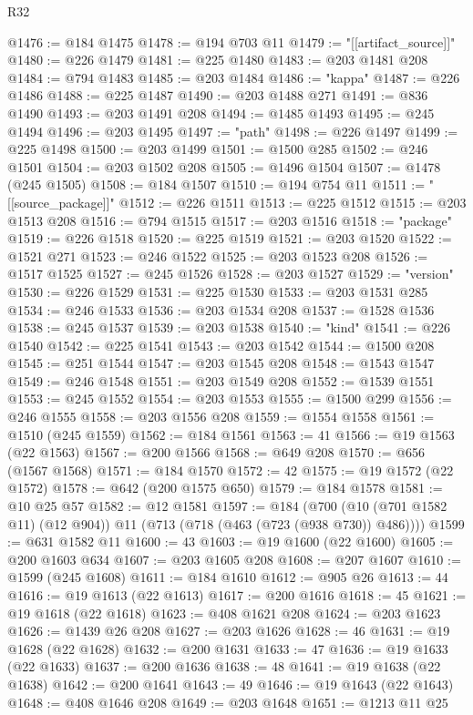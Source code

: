 \begin{lexlean}{R32}
\begin{coremodule}
@1476 := @184 @1475
@1478 := @194 @703 @11
@1479 := "[[artifact_source]]"
@1480 := @226 @1479
@1481 := @225 @1480
@1483 := @203 @1481 @208
@1484 := @794 @1483
@1485 := @203 @1484
@1486 := "kappa"
@1487 := @226 @1486
@1488 := @225 @1487
@1490 := @203 @1488 @271
@1491 := @836 @1490
@1493 := @203 @1491 @208
@1494 := @1485 @1493
@1495 := @245 @1494
@1496 := @203 @1495
@1497 := "path"
@1498 := @226 @1497
@1499 := @225 @1498
@1500 := @203 @1499
@1501 := @1500 @285
@1502 := @246 @1501
@1504 := @203 @1502 @208
@1505 := @1496 @1504
@1507 := @1478 (@245 @1505)
@1508 := @184 @1507
@1510 := @194 @754 @11
@1511 := "[[source_package]]"
@1512 := @226 @1511
@1513 := @225 @1512
@1515 := @203 @1513 @208
@1516 := @794 @1515
@1517 := @203 @1516
@1518 := "package"
@1519 := @226 @1518
@1520 := @225 @1519
@1521 := @203 @1520
@1522 := @1521 @271
@1523 := @246 @1522
@1525 := @203 @1523 @208
@1526 := @1517 @1525
@1527 := @245 @1526
@1528 := @203 @1527
@1529 := "version"
@1530 := @226 @1529
@1531 := @225 @1530
@1533 := @203 @1531 @285
@1534 := @246 @1533
@1536 := @203 @1534 @208
@1537 := @1528 @1536
@1538 := @245 @1537
@1539 := @203 @1538
@1540 := "kind"
@1541 := @226 @1540
@1542 := @225 @1541
@1543 := @203 @1542
@1544 := @1500 @208
@1545 := @251 @1544
@1547 := @203 @1545 @208
@1548 := @1543 @1547
@1549 := @246 @1548
@1551 := @203 @1549 @208
@1552 := @1539 @1551
@1553 := @245 @1552
@1554 := @203 @1553
@1555 := @1500 @299
@1556 := @246 @1555
@1558 := @203 @1556 @208
@1559 := @1554 @1558
@1561 := @1510 (@245 @1559)
@1562 := @184 @1561
@1563 := 41
@1566 := @19 @1563 (@22 @1563)
@1567 := @200 @1566
@1568 := @649 @208
@1570 := @656 (@1567 @1568)
@1571 := @184 @1570
@1572 := 42
@1575 := @19 @1572 (@22 @1572)
@1578 := @642 (@200 @1575 @650)
@1579 := @184 @1578
@1581 := @10 @25 @57
@1582 := @12 @1581
@1597 := @184
    (@700 (@10 (@701 @1582 @11) (@12 @904)) @11 (@713 (@718 (@463 (@723 (@938 @730)) @486))))
@1599 := @631 @1582 @11
@1600 := 43
@1603 := @19 @1600 (@22 @1600)
@1605 := @200 @1603 @634
@1607 := @203 @1605 @208
@1608 := @207 @1607
@1610 := @1599 (@245 @1608)
@1611 := @184 @1610
@1612 := @905 @26
@1613 := 44
@1616 := @19 @1613 (@22 @1613)
@1617 := @200 @1616
@1618 := 45
@1621 := @19 @1618 (@22 @1618)
@1623 := @408 @1621 @208
@1624 := @203 @1623
@1626 := @1439 @26 @208
@1627 := @203 @1626
@1628 := 46
@1631 := @19 @1628 (@22 @1628)
@1632 := @200 @1631
@1633 := 47
@1636 := @19 @1633 (@22 @1633)
@1637 := @200 @1636
@1638 := 48
@1641 := @19 @1638 (@22 @1638)
@1642 := @200 @1641
@1643 := 49
@1646 := @19 @1643 (@22 @1643)
@1648 := @408 @1646 @208
@1649 := @203 @1648
@1651 := @1213 @11 @25

\end{coremodule}
\end{lexlean}
